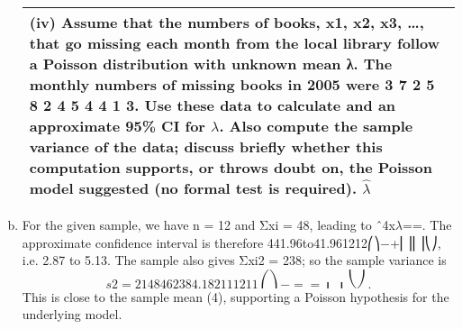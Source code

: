 \documentclass[a4paper,12pt]{article}
\begin{document}
\begin{enumerate}[(a)]
\begin{table}[ht!]
\begin{tabular}{|p{15cm}|}
(iv) Assume that the numbers of books, x1, x2, x3, …, that go missing each month from the local library follow a Poisson 
distribution with unknown mean λ. The monthly numbers of missing books in 2005 were
3 7 2 5 8 2 4 5 4 4 1 3.
Use these data to calculate and an approximate 95\% CI for $\lambda$. Also compute the sample variance of the data; discuss 
briefly whether this computation supports, or throws doubt on, the Poisson model suggested (no formal test is required). $\hat{\lambda}$
\\ \hline
 
\end{tabular}
\end{table}
\item  For the given sample, we have n = 12 and Σxi = 48, leading to ˆ4x$\lambda$==. The approximate confidence interval is therefore
441.96to41.961212⎛⎞−+⎜⎟⎜⎟⎝⎠, i.e. 2.87 to 5.13.
The sample also gives Σxi2 = 238; so the sample variance is
\[s2 = 2148462384.182111211⎛⎞−==⎜⎟⎝⎠.\]
This is close to the sample mean (4), supporting a Poisson hypothesis for the underlying model.
\end{enumerate}
\end{document}
